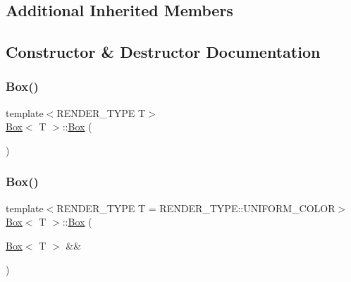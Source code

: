 \subsection*{Additional Inherited Members}


\subsection{Constructor \& Destructor Documentation}
\mbox{\label{classBox_a057f84d8fa68647c6484d4e004d8ab74}} 
\subsubsection{\texorpdfstring{Box()}{Box()}\hspace{0.1cm}{\footnotesize\ttfamily [1/3]}}
{\footnotesize\ttfamily template$<$R\+E\+N\+D\+E\+R\+\_\+\+T\+Y\+PE T$>$ \\
\mbox{\hyperlink{classBox}{Box}}$<$ T $>$\+::\mbox{\hyperlink{classBox}{Box}} (\begin{DoxyParamCaption}{ }\end{DoxyParamCaption})}

\mbox{\label{classBox_af72b67fa2f421acbe9a7d3d1bcd540d1}} 
\subsubsection{\texorpdfstring{Box()}{Box()}\hspace{0.1cm}{\footnotesize\ttfamily [2/3]}}
{\footnotesize\ttfamily template$<$R\+E\+N\+D\+E\+R\+\_\+\+T\+Y\+PE T = R\+E\+N\+D\+E\+R\+\_\+\+T\+Y\+P\+E\+::\+U\+N\+I\+F\+O\+R\+M\+\_\+\+C\+O\+L\+OR$>$ \\
\mbox{\hyperlink{classBox}{Box}}$<$ T $>$\+::\mbox{\hyperlink{classBox}{Box}} (\begin{DoxyParamCaption}\item[{\mbox{\hyperlink{classBox}{Box}}$<$ T $>$ \&\&}]{ }\end{DoxyParamCaption})\hspace{0.3cm}{\ttfamily [default]}}

\mbox{\label{classBox_aab49a6687d04530ec60421bcbdb929c2}} 
